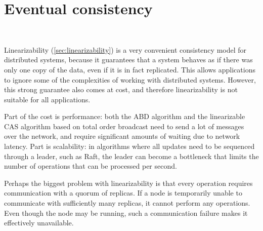\section{Eventual consistency}\label{sec:eventual-consistency}

\begin{frame}
    \begin{center}
        {\Large{\color{darkblue}{Eventual Consistency}}} \\[2em]
        \mydetails
    \end{center}
\end{frame}

Linearizability (\autoref{sec:linearizability}) is a very convenient consistency model for distributed systems, because it guarantees that a system behaves as if there was only one copy of the data, even if it is in fact replicated.
This allows applications to ignore some of the complexities of working with distributed systems.
However, this strong guarantee also comes at cost, and therefore linearizability is not suitable for all applications.

Part of the cost is performance: both the ABD algorithm and the linearizable CAS algorithm based on total order broadcast need to send a lot of messages over the network, and require significant amounts of waiting due to network latency.
Part is scalability: in algorithms where all updates need to be sequenced through a leader, such as Raft, the leader can become a bottleneck that limits the number of operations that can be processed per second.

Perhaps the biggest problem with linearizability is that every operation requires communication with a quorum of replicas.
If a node is temporarily unable to communicate with sufficiently many replicas, it cannot perform any operations.
Even though the node may be running, such a communication failure makes it effectively unavailable.

